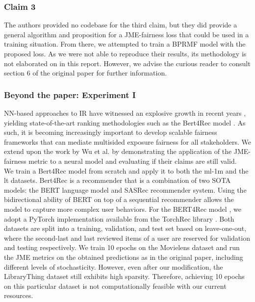 \subsubsection{Claim 3} The authors provided no codebase for the third claim, but they did provide a general algorithm and proposition for a JME-fairness loss that could be used in a training situation. From there, we attempted to train a BPRMF model with the proposed loss. As we were not able to reproduce their results, its methodology is not elaborated on in this report. However, we advise the curious reader to consult section 6 of the original paper for further information. 

\subsubsection{Beyond the paper: Experiment I} 
NN-based approaches to IR have witnessed an explosive growth in recent years \cite{kenter2018} \cite{mitra2017neural} \cite{Onal2018NeuralIR}, yielding state-of-the-art ranking methodologies such as the Bert4Rec model \cite{Sun:2019}. As such, it is becoming increasingly important to develop scalable fairness frameworks that can mediate multisided exposure fairness for all stakeholders. We extend upon the work by Wu et al. by demonstrating the application of the JME-fairness metric to a neural model and evaluating if their claims are still valid. \\

We train a Bert4Rec model from scratch and apply it to both the ml-1m and the lt datasets. Bert4Rec is a recommender that is a combination of two SOTA models: the BERT language model and SASRec recommender system. Using the bidirectional ability of BERT on top of a sequential recommender allows the model to capture more complex user behaviors. For the BERT4Rec model \cite{Sun:2019}, we adopt a PyTorch implementation available from the TorchRec library \cite{Sungit2019}. Both datasets are split into a training, validation, and test set based on leave-one-out, where the second-last and last reviewed items of a user are reserved for validation and testing respectively. We train 10 epochs on the Movielens dataset and run the JME metrics on the obtained predictions as in the original paper, including different levels of stochasticity. However, even after our modification, the LibraryThing dataset still exhibits high sparsity. Therefore, achieving 10 epochs on this particular dataset is not computationally feasible with our current resources. 

